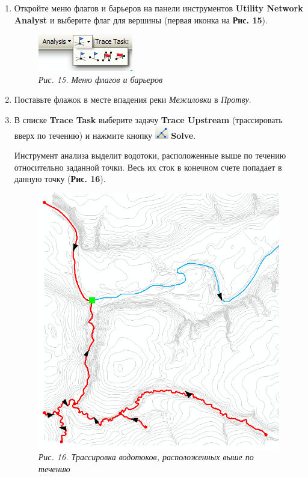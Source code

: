 \documentclass[12pt,]{book}
\begin{document}
\begin{enumerate}
\def\labelenumi{\arabic{enumi}.}
\item
  Откройте меню флагов и барьеров на панели инструментов \textbf{Utility Network Analyst} и выберите флаг для вершины (первая иконка на \textbf{Рис. 15}).

  \begin{figure}
  \centering
  \includegraphics{images/Ex13/image28.png}
  \caption{\emph{Рис. 15. Меню флагов и барьеров}}
  \end{figure}
\item
  Поставьте флажок в месте впадения реки \emph{Межиловки} в \emph{Протву}.
\item
  В списке \textbf{Trace Task} выберите задачу \textbf{Trace Upstream} (трассировать вверх по течению) и нажмите кнопку \includegraphics{images/Ex13/image29.png} \textbf{Solve}.

  Инструмент анализа выделит водотоки, расположенные выше по течению относительно заданной точки. Весь их сток в конечном счете попадает в данную точку (\textbf{Рис. 16}).

  \begin{figure}
  \centering
  \includegraphics{images/Ex13/image30.png}
  \caption{\emph{Рис. 16. Трассировка водотоков, расположенных выше по течению}}
  \end{figure}


\end{enumerate}
\end{document}
